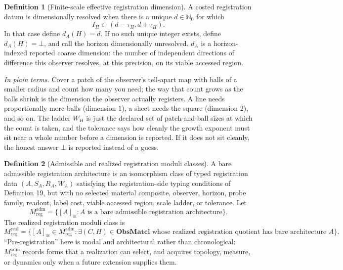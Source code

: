 \documentclass[11pt]{article}
\theoremstyle{definition}
\newtheorem{definition}{Definition}
\newcommand{\ObsMatcl}{\mathbf{ObsMatcl}}
\newcommand{\plainterms}{\emph{In plain terms.}}
\begin{document}
\begin{definition}[Finite-scale effective registration dimension]
A costed registration datum is dimensionally resolved when there is a unique $d \in \mathbb{N}_0$ for which
\begin{equation}
I_H \subset (d - \tau_H, d + \tau_H). \tag{S17}
\end{equation}
In that case define $d_A(H) = d$. If no such unique integer exists, define $d_A(H) = \bot$, and call the horizon dimensionally unresolved. $d_A$ is a horizon-indexed reported coarse dimension: the number of independent directions of difference this observer resolves, at this precision, on its viable accessed region.
\end{definition}

\noindent\plainterms{} Cover a patch of the observer's tell-apart map with balls of a smaller radius and count how many you need; the way that count grows as the balls shrink is the dimension the observer actually registers. A line needs proportionally more balls (dimension 1), a sheet needs the square (dimension 2), and so on. The ladder $W_H$ is just the declared set of patch-and-ball sizes at which the count is taken, and the tolerance says how cleanly the growth exponent must sit near a whole number before a dimension is reported. If it does not sit cleanly, the honest answer $\bot$ is reported instead of a guess.

\begin{definition}[Admissible and realized registration moduli classes]
A bare admissible registration architecture is an isomorphism class of typed registration data $(A, S_A, R_A, W_A)$ satisfying the registration-side typing conditions of Definition 19, but with no selected material composite, observer, horizon, probe family, readout, label cost, viable accessed region, scale ladder, or tolerance. Let
\begin{equation}
M^{\mathrm{adm}}_{\mathrm{reg}} = \{[A]_{\cong} : A \text{ is a bare admissible registration architecture}\}. \tag{S18}
\end{equation}
The realized registration moduli class is
\begin{equation}
M^{\mathrm{real}}_{\mathrm{reg}} = \{[A]_{\cong} \in M^{\mathrm{adm}}_{\mathrm{reg}} : \exists (C, H) \in \ObsMatcl \text{ whose realized registration quotient has bare architecture } A\}. \tag{S19}
\end{equation}
``Pre-registration'' here is modal and architectural rather than chronological: $M^{\mathrm{adm}}_{\mathrm{reg}}$ records forms that a realization can select, and acquires topology, measure, or dynamics only when a future extension supplies them.
\end{definition}
\end{document}
